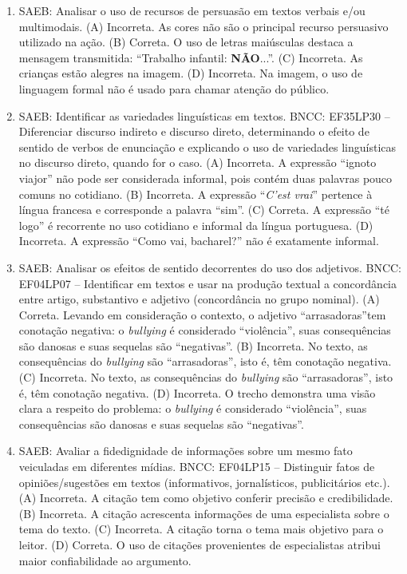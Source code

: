 \begin{enumerate}
\item
SAEB: Analisar o uso de recursos de persuasão em textos verbais e/ou multimodais. 
(A) Incorreta. As cores não são o principal recurso persuasivo utilizado na ação. 
(B) Correta. O uso de letras maiúsculas destaca a mensagem transmitida: ``Trabalho infantil: \textbf{NÃO}...''. 
(C) Incorreta. As crianças estão alegres na imagem. 
(D) Incorreta. Na imagem, o uso de linguagem formal não é usado para chamar atenção do público.

\item
SAEB: Identificar as variedades linguísticas em textos. BNCC: EF35LP30 -- Diferenciar discurso indireto e discurso direto, determinando o efeito de sentido de verbos de enunciação e explicando o uso de variedades linguísticas no discurso direto, quando for o caso. 
(A) Incorreta. A expressão ``ignoto viajor'' não pode ser considerada informal, pois contém duas palavras pouco comuns no cotidiano. 
(B) Incorreta. A expressão ``\textit{C'est vrai}'' pertence à língua francesa e corresponde a palavra ``sim''. 
(C) Correta. A expressão ``té logo'' é recorrente no uso cotidiano e informal da língua portuguesa. 
(D) Incorreta. A expressão ``Como vai, bacharel?'' não é exatamente informal.

\item
SAEB: Analisar os efeitos de sentido decorrentes do uso dos adjetivos. BNCC: EF04LP07 -- Identificar em textos e usar na produção textual a concordância entre artigo, substantivo e adjetivo (concordância no grupo nominal). 
(A) Correta. Levando em consideração o contexto, o adjetivo ``arrasadoras''tem conotação negativa: o \textit{bullying} é considerado ``violência'', suas consequências são danosas e suas sequelas são ``negativas''. 
(B) Incorreta. No texto, as consequências do \textit{bullying} são ``arrasadoras'', isto é, têm conotação negativa. 
(C) Incorreta. No texto, as consequências do \textit{bullying} são ``arrasadoras'', isto é, têm conotação negativa. 
(D) Incorreta. O trecho demonstra uma visão clara a respeito do problema: o \textit{bullying} é considerado ``violência'', suas consequências são danosas e suas sequelas são ``negativas''.

\item
SAEB: Avaliar a fidedignidade de informações sobre um mesmo fato veiculadas em diferentes mídias. BNCC: EF04LP15 -- Distinguir fatos de opiniões/sugestões em textos (informativos, jornalísticos, publicitários etc.). 
(A) Incorreta. A citação tem como objetivo conferir precisão e credibilidade. 
(B) Incorreta. A citação acrescenta informações de uma especialista sobre o tema do texto. 
(C) Incorreta. A citação torna o tema mais objetivo para o leitor. 
(D) Correta. O uso de citações provenientes de especialistas atribui maior confiabilidade ao argumento.


\end{enumerate}
